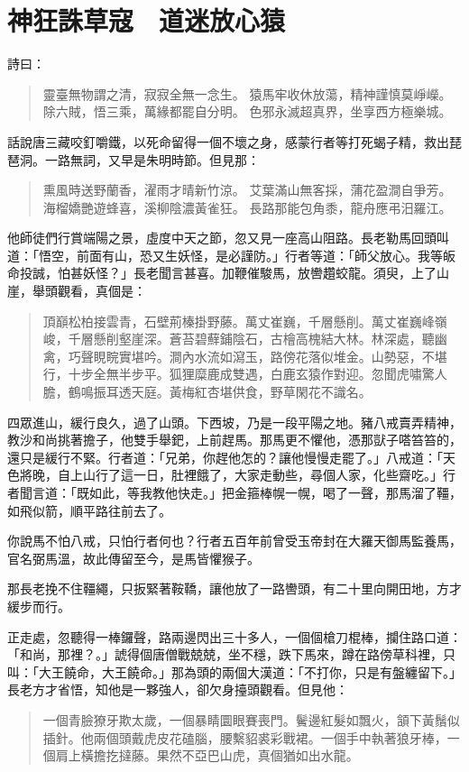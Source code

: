 
\chapter{神狂誅草寇　道迷放心猿}

詩曰：
\begin{quote}
靈臺無物謂之清，寂寂全無一念生。
猿馬牢收休放蕩，精神謹慎莫崢嶸。
除六賊，悟三乘，萬緣都罷自分明。
色邪永滅超真界，坐享西方極樂城。
\end{quote}

話說唐三藏咬釘嚼鐵，以死命留得一個不壞之身，感蒙行者等打死蝎子精，救出琵琶洞。一路無詞，又早是朱明時節。但見那：
\begin{quote}
熏風時送野蘭香，濯雨才晴新竹涼。
艾葉滿山無客採，蒲花盈澗自爭芳。
海榴嬌艷遊蜂喜，溪柳陰濃黃雀狂。
長路那能包角黍，龍舟應弔汨羅江。
\end{quote}

他師徒們行賞端陽之景，虛度中天之節，忽又見一座高山阻路。長老勒馬回頭叫道：「悟空，前面有山，恐又生妖怪，是必謹防。」行者等道：「師父放心。我等皈命投誠，怕甚妖怪？」長老聞言甚喜。加鞭催駿馬，放轡趲蛟龍。須臾，上了山崖，舉頭觀看，真個是：
\begin{quote}
頂巔松柏接雲青，石壁荊榛掛野藤。萬丈崔巍，千層懸削。萬丈崔巍峰嶺峻，千層懸削壑崖深。蒼苔碧蘚鋪陰石，古檜高槐結大林。林深處，聽幽禽，巧聲睍睆實堪吟。澗內水流如瀉玉，路傍花落似堆金。山勢惡，不堪行，十步全無半步平。狐狸糜鹿成雙遇，白鹿玄猿作對迎。忽聞虎嘯驚人膽，鶴鳴振耳透天庭。黃梅紅杏堪供食，野草閑花不識名。
\end{quote}

四眾進山，緩行良久，過了山頭。下西坡，乃是一段平陽之地。豬八戒賣弄精神，教沙和尚挑著擔子，他雙手舉鈀，上前趕馬。那馬更不懼他，憑那獃子嗒笞笞的，還只是緩行不緊。行者道：「兄弟，你趕他怎的？讓他慢慢走罷了。」八戒道：「天色將晚，自上山行了這一日，肚裡餓了，大家走動些，尋個人家，化些齋吃。」行者聞言道：「既如此，等我教他快走。」把金箍棒幌一幌，喝了一聲，那馬溜了韁，如飛似箭，順平路往前去了。

你說馬不怕八戒，只怕行者何也？行者五百年前曾受玉帝封在大羅天御馬監養馬，官名弼馬溫，故此傳留至今，是馬皆懼猴子。

那長老挽不住韁繩，只扳緊著鞍鞽，讓他放了一路轡頭，有二十里向開田地，方才緩步而行。

正走處，忽聽得一棒鑼聲，路兩邊閃出三十多人，一個個槍刀棍棒，攔住路口道：「和尚，那裡？。」諕得個唐僧戰兢兢，坐不穩，跌下馬來，蹲在路傍草科裡，只叫：「大王饒命，大王饒命。」那為頭的兩個大漢道：「不打你，只是有盤纏留下。」長老方才省悟，知他是一夥強人，卻欠身擡頭觀看。但見他：
\begin{quote}
一個青臉獠牙欺太歲，一個暴睛圜眼賽喪門。鬢邊紅髮如飄火，頷下黃鬚似插針。他兩個頭戴虎皮花磕腦，腰繫貂裘彩戰裙。一個手中執著狼牙棒，一個肩上橫擔扢撻藤。果然不亞巴山虎，真個猶如出水龍。
\end{quote}

